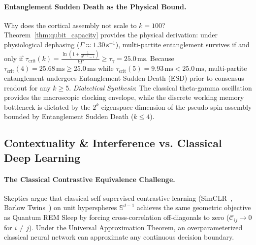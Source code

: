 \documentclass[10pt,twocolumn,3p]{article}
\begin{document}
\paragraph{Entanglement Sudden Death as the Physical Bound.}
Why does the cortical assembly not scale to $k = 100$? Theorem~\ref{thm:qubit_capacity} provides the physical derivation: under physiological dephasing ($\Gamma \approx 1.30\,\text{s}^{-1}$), multi-partite entanglement survives if and only if $\tau_{\text{crit}}(k) = \frac{\ln(1 + \frac{1}{2^{k-1}-1})}{k \Gamma} \ge \tau_\gamma = 25.0\,\text{ms}$. Because $\tau_{\text{crit}}(4) = 25.68\,\text{ms} \ge 25.0\,\text{ms}$ while $\tau_{\text{crit}}(5) = 9.93\,\text{ms} < 25.0\,\text{ms}$, multi-partite entanglement undergoes Entanglement Sudden Death (ESD) prior to consensus readout for any $k \ge 5$.
\textit{Dialectical Synthesis}: The classical theta-gamma oscillation provides the macroscopic clocking envelope, while the discrete working memory bottleneck is dictated by the $2^k$ eigenspace dimension of the pseudo-spin assembly bounded by Entanglement Sudden Death ($k \le 4$).

\subsection{Contextuality \& Interference vs. Classical Deep Learning}
\label{subsec:dial_contextuality_vs_classical}

\paragraph{The Classical Contrastive Equivalence Challenge.}
Skeptics argue that classical self-supervised contrastive learning (SimCLR~\cite{chen2020}, Barlow Twins~\cite{zbontar2021}) on unit hyperspheres $\mathbb{S}^{d-1}$ achieves the same geometric objective as Quantum REM Sleep by forcing cross-correlation off-diagonals to zero ($\mathcal{C}_{ij} \to 0$ for $i \ne j$). Under the Universal Approximation Theorem, an overparameterized classical neural network can approximate any continuous decision boundary.
\end{document}
